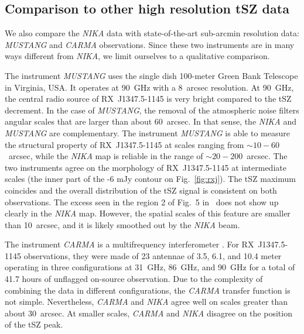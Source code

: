 \subsection{Comparison to other high resolution tSZ data}
\label{sec:comp_otherSZ}
We also compare the {\it NIKA} data with state-of-the-art sub-arcmin resolution data: {\it MUSTANG} \citep{mason_2010, korngut_2011} and {\it CARMA} \citep{plagge_2012} observations. Since these two instruments are in many ways different from {\it NIKA}, we limit ourselves to a qualitative comparison.

The instrument {\it MUSTANG} uses the single dish 100-meter Green Bank Telescope in Virginia, USA. It operates at 90~GHz with a 8~arcsec resolution. At 90~GHz, the central radio source of \mbox{RX~J1347.5-1145} is very bright compared to the tSZ decrement.  In the case of  {\it MUSTANG}, the removal of the atmospheric noise filters angular scales that are larger than about 60~arcsec. In that sense, the {\it NIKA} and {\it MUSTANG} are complementary. The instrument {\it MUSTANG} is able to measure the structural property of \mbox{RX~J1347.5-1145} at scales ranging from $\sim 10 - 60$~arcsec, while the {\it NIKA} map is reliable in the range of $\sim 20 - 200$~arcsec. The two instruments agree on the morphology of \mbox{RX~J1347.5-1145} at intermediate scales (the inner part of the -6 mJy contour on Fig.~\ref{fig:rxj}). The tSZ maximum coincides and the overall distribution of the tSZ signal is consistent on both observations. The excess seen in the region 2 of Fig.~5 in~\cite{mason_2010} does not show up clearly in the {\it NIKA} map. However, the spatial scales of this feature are smaller than 10~arcsec, and it is likely smoothed out by the {\it NIKA} beam.

The instrument {\it CARMA} is a multifrequency interferometer \citep{plagge_2012}. For \mbox{RX~J1347.5-1145} observations, they were made of 23 antennae of 3.5, 6.1, and 10.4 meter operating in three configurations at 31~GHz, 86~GHz, and 90~GHz for a total of 41.7 hours of unflagged on-source observation. Due to the complexity of combining the data in different configurations, the {\it CARMA} transfer function is not simple. Nevertheless, {\it CARMA} and {\it NIKA} agree well on scales greater than about 30~arcsec. At smaller scales, {\it CARMA} and {\it NIKA} disagree on the position of the tSZ peak.

